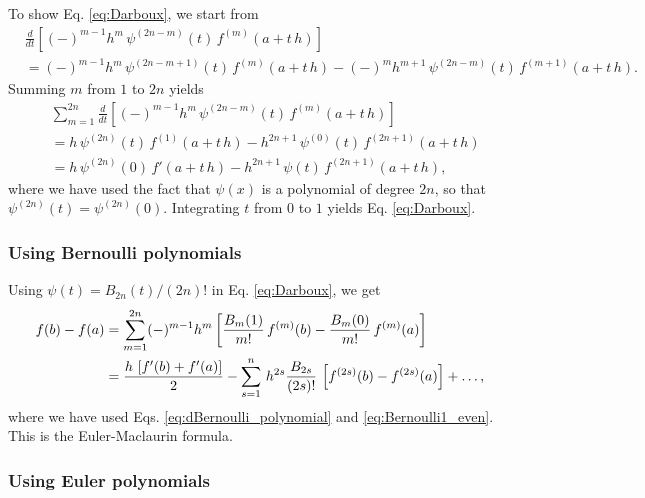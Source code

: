 \documentclass[aip,jcp,preprint,notitlepage, superscriptaddress]{revtex4-1}
\begin{document}
To show Eq. \eqref{eq:Darboux},
we start from
%
\begin{align*}
&\frac{ d } { dt }
\left[
  (-)^{m - 1} h^m \,
  \psi^{(2 n - m)}(t) \, f^{(m)}(a + t \, h)
\right]
\\
&=
(-)^{m-1} h^m \,
  \psi^{(2 n - m + 1)}(t) \, f^{(m)}(a + t \, h)
-
(-)^m h^{m + 1} \,
  \psi^{(2 n - m)}(t) \, f^{(m + 1)}(a + t \, h).
\end{align*}
%
Summing $m$ from $1$ to $2 n$ yields
%
\begin{align*}
&\sum_{m = 1}^{2 n}
\frac{ d } { dt }
  \left[
    (-)^{m - 1} h^m \,
    \psi^{(2 n - m)}(t) \, f^{(m)}(a + t \, h)
  \right]
\\
&=
h \,
  \psi^{(2 n)}(t) \, f^{(1)}(a + t \, h)
-
h^{2 n + 1} \,
  \psi^{(0)}(t) \, f^{(2 n + 1)}(a + t \, h)
\\
&=
h \,
  \psi^{(2 n)}(0) \, f'(a + t \, h)
-
h^{2 n + 1} \,
  \psi(t) \, f^{(2 n + 1)}(a + t \, h),
\end{align*}
%
where
we have used the fact that
$\psi(x)$ is a polynomial of degree $2n$,
so that
$\psi^{(2 n)}(t) = \psi^{(2 n)}(0)$.
%
Integrating $t$ from $0$ to $1$
yields Eq. \eqref{eq:Darboux}.



\subsubsection{Using Bernoulli polynomials}



Using $\psi(t) = B_{2n}(t)/(2n)!$ in Eq. \eqref{eq:Darboux},
we get
\begin{align}
f(b) - f(a)
&=
\sum_{m = 1}^{2n}
  (-)^{m - 1} h^m
  \left[
    \frac{ B_m(1) } {m!} \, f^{(m)}(b)
    -
    \frac{ B_m(0) } {m!} \, f^{(m)}(a)
  \right]
\notag \\
&=
\frac{ h \, \left[
    f'(b) + f'(a)
  \right]
} {2 }
-
\sum_{s = 1}^{n}
\, h^{2 s}
\frac{ B_{2 s} }{ (2 s)! }
    \, \left[f^{(2 s)}(b) - f^{(2 s)}(a)\right]
  + \dots,
\label{eq:Darboux_Bernoulli}
\end{align}
where we have used
Eqs. \eqref{eq:dBernoulli_polynomial} and \eqref{eq:Bernoulli1_even}.
%
This is the Euler-Maclaurin formula\cite{
arfken, whittaker, wang_specfunc, abramowitz}.
%



\subsubsection{Using Euler polynomials}
\end{document}
